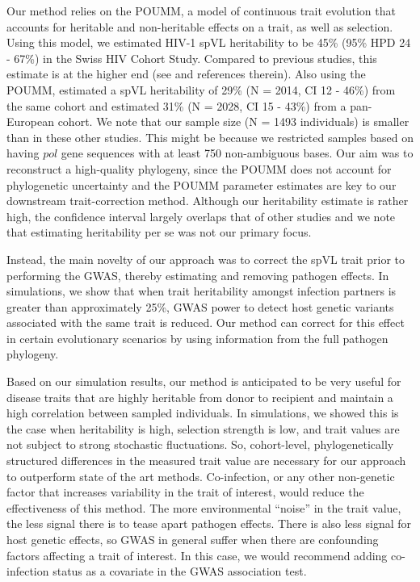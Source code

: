 \documentclass[11pt]{article}
\begin{document}
\begin{linenumbers}
Our method relies on the POUMM, a model of continuous trait evolution that accounts for heritable and non-heritable effects on a trait, as well as selection. Using this model, we estimated HIV-1 spVL heritability to be 45\% (95\% HPD 24 - 67\%) in the Swiss HIV Cohort Study. Compared to previous studies, this estimate is at the higher end (see \citet{Mitov2018} and references therein). Also using the POUMM, \citet{Bertels2018} estimated a spVL heritability of 29\% (N = 2014, CI 12 - 46\%) from the same cohort and \citet{Blanquart2017} estimated 31\% (N = 2028, CI 15 - 43\%) from a pan-European cohort. We note that our sample size (N = 1493 individuals) is smaller than in these other studies. This might be because we restricted samples based on having $pol$ gene sequences with at least 750 non-ambiguous bases. Our aim was to reconstruct a high-quality phylogeny, since the POUMM does not account for phylogenetic uncertainty and the POUMM parameter estimates are key to our downstream trait-correction method. Although our heritability estimate is rather high, the confidence interval largely overlaps that of other studies and we note that estimating heritability per se was not our primary focus.

Instead, the main novelty of our approach was to correct the spVL trait prior to performing the GWAS, thereby estimating and removing pathogen effects. In simulations, we show that when trait heritability amongst infection partners is greater than approximately 25\%, GWAS power to detect host genetic variants associated with the same trait is reduced. Our method can correct for this effect in certain evolutionary scenarios by using information from the full pathogen phylogeny. 

Based on our simulation results, our method is anticipated to be very useful for disease traits that are highly heritable from donor to recipient and  maintain a high correlation between sampled individuals. In simulations, we showed this is the case when heritability is high, selection strength is low, and trait values are not subject to strong stochastic fluctuations. So, cohort-level, phylogenetically structured differences in the measured trait value are necessary for our approach to outperform state of the art methods. Co-infection, or any other non-genetic factor that increases variability in the trait of interest, would reduce the effectiveness of this method. The more environmental ``noise'' in the trait value, the less signal there is to tease apart pathogen effects. There is also less signal for host genetic effects, so GWAS in general suffer when there are confounding factors affecting a trait of interest. In this case, we would recommend adding co-infection status as a covariate in the GWAS association test.


\end{linenumbers}
\end{document}
